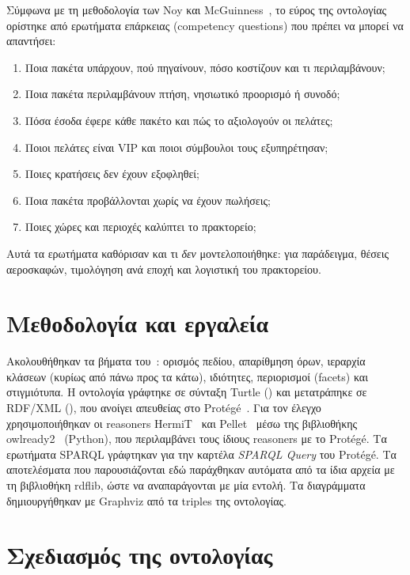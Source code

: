 \documentclass[conference]{IEEEtran}
\begin{document}
Σύμφωνα με τη μεθοδολογία των Noy και McGuinness~\cite{noy2001}, το εύρος της
οντολογίας ορίστηκε από ερωτήματα επάρκειας (competency questions) που πρέπει να
μπορεί να απαντήσει:
\begin{enumerate}
\item Ποια πακέτα υπάρχουν, πού πηγαίνουν, πόσο κοστίζουν και τι περιλαμβάνουν;
\item Ποια πακέτα περιλαμβάνουν πτήση, νησιωτικό προορισμό ή συνοδό;
\item Πόσα έσοδα έφερε κάθε πακέτο και πώς το αξιολογούν οι πελάτες;
\item Ποιοι πελάτες είναι VIP και ποιοι σύμβουλοι τους εξυπηρέτησαν;
\item Ποιες κρατήσεις δεν έχουν εξοφληθεί;
\item Ποια πακέτα προβάλλονται χωρίς να έχουν πωλήσεις;
\item Ποιες χώρες και περιοχές καλύπτει το πρακτορείο;
\end{enumerate}
Αυτά τα ερωτήματα καθόρισαν και τι \emph{δεν} μοντελοποιήθηκε: για παράδειγμα,
θέσεις αεροσκαφών, τιμολόγηση ανά εποχή και λογιστική του πρακτορείου.

\section{Μεθοδολογία και εργαλεία}

Ακολουθήθηκαν τα βήματα του~\cite{noy2001}: ορισμός πεδίου, απαρίθμηση όρων,
ιεραρχία κλάσεων (κυρίως από πάνω προς τα κάτω), ιδιότητες, περιορισμοί
(facets) και στιγμιότυπα. Η οντολογία γράφτηκε σε σύνταξη Turtle
() και μετατράπηκε σε RDF/XML (),
που ανοίγει απευθείας στο Protégé~\cite{protege}. Για τον έλεγχο χρησιμοποιήθηκαν
οι reasoners HermiT~\cite{hermit} και Pellet~\cite{pellet} μέσω της βιβλιοθήκης
owlready2~\cite{owlready} (Python), που περιλαμβάνει τους ίδιους reasoners με το
Protégé. Τα ερωτήματα SPARQL γράφτηκαν για την καρτέλα \emph{SPARQL Query} του
Protégé. Τα αποτελέσματα που παρουσιάζονται εδώ παράχθηκαν αυτόματα από τα ίδια
αρχεία με τη βιβλιοθήκη rdflib, ώστε να αναπαράγονται με μία εντολή. Τα
διαγράμματα δημιουργήθηκαν με Graphviz από τα triples της οντολογίας.

\section{Σχεδιασμός της οντολογίας}
\end{document}
